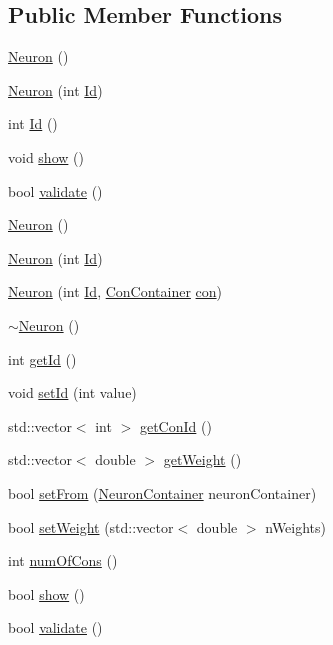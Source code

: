 \subsection*{Public Member Functions}
\begin{DoxyCompactItemize}
\item 
\hyperlink{class_neuron_a823487d01615fadb8ac19a2768dd9d96}{Neuron} ()
\item 
\hyperlink{class_neuron_a05698a11ac18b6cee34d18f63681ddcc}{Neuron} (int \hyperlink{class_neuron_a72bb327a7c5c865e6748a4e074ce0680}{Id})
\item 
int \hyperlink{class_neuron_afeb9899e815fd0f56e28eb0bc1f965a8}{Id} ()
\item 
void \hyperlink{class_neuron_a255c3597520c730d798218f7174eff1b}{show} ()
\item 
bool \hyperlink{class_neuron_a95327aa80a9ec949491f214a0c159b5a}{validate} ()
\item 
\hyperlink{class_neuron_a823487d01615fadb8ac19a2768dd9d96}{Neuron} ()
\item 
\hyperlink{class_neuron_a05698a11ac18b6cee34d18f63681ddcc}{Neuron} (int \hyperlink{class_neuron_a72bb327a7c5c865e6748a4e074ce0680}{Id})
\item 
\hyperlink{class_neuron_acc10f105d08a2303a0282bbafa03b032}{Neuron} (int \hyperlink{class_neuron_a72bb327a7c5c865e6748a4e074ce0680}{Id}, \hyperlink{class_con_container}{ConContainer} \hyperlink{class_neuron_a1e92229eb19c3f322e118bdf23b9844e}{con})
\item 
\hyperlink{class_neuron_a94a250ce7e167760e593979b899745b1}{$\sim$Neuron} ()
\item 
int \hyperlink{class_neuron_ad9211d55ea50ad6dfbd2676b9e2335e4}{getId} ()
\item 
void \hyperlink{class_neuron_aa93290c13b40c5b07d92f272a0a2ce63}{setId} (int value)
\item 
std::vector$<$ int $>$ \hyperlink{class_neuron_acb4a225069611af4aa1723170e196e82}{getConId} ()
\item 
std::vector$<$ double $>$ \hyperlink{class_neuron_a8c0ab449acb35177af8d89651e49f357}{getWeight} ()
\item 
bool \hyperlink{class_neuron_ac8129f5de3ec1c143f40d507b6843649}{setFrom} (\hyperlink{class_neuron_container}{NeuronContainer} neuronContainer)
\item 
bool \hyperlink{class_neuron_a93b27c179c576758ff437b9273b95041}{setWeight} (std::vector$<$ double $>$ nWeights)
\item 
int \hyperlink{class_neuron_ae447dce39ed04581609a83d742b585d1}{numOfCons} ()
\item 
bool \hyperlink{class_neuron_a255c3597520c730d798218f7174eff1b}{show} ()
\item 
bool \hyperlink{class_neuron_a95327aa80a9ec949491f214a0c159b5a}{validate} ()
\end{DoxyCompactItemize}
